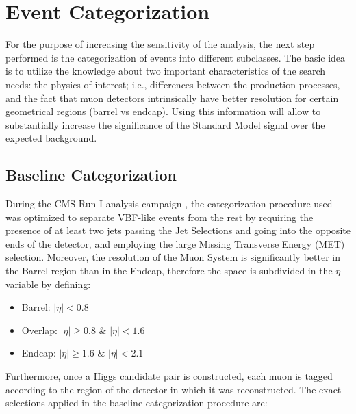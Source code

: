 \section{Event Categorization}\label{section:higgs_categorization}
For the purpose of increasing the sensitivity of the analysis, the next step performed is the categorization of events into different subclasses. The basic idea is to utilize the knowledge about two important characteristics of the search needs: the physics of interest; i.e., differences between the production processes, and the fact that muon detectors intrinsically have better resolution for certain geometrical regions (barrel vs endcap). Using this information will allow to substantially increase the significance of the Standard Model signal over the expected background.

\subsection{Baseline Categorization}
During the CMS Run I analysis campaign \cite{CMSHiggsRunI}, the categorization procedure used was optimized to separate VBF-like events from the rest by requiring the presence of at least two jets passing the Jet Selections and going into the opposite ends of the detector, and employing the large Missing Transverse Energy (MET) selection. Moreover, the resolution of the Muon System is significantly better in the Barrel region than in the Endcap, therefore the space is subdivided in the $\eta$ variable by defining:
\begin{itemize}
  \item Barrel: $|\eta| < 0.8$
  \item Overlap: $|\eta| \ge 0.8$ \& $|\eta| < 1.6$
  \item Endcap: $|\eta| \ge 1.6$ \& $|\eta| < 2.1$
\end{itemize}
Furthermore, once a Higgs candidate pair is constructed, each muon is tagged according to the region of the detector in which it was reconstructed. The exact selections applied in the baseline categorization procedure are:

